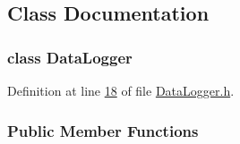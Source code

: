 \subsection{Class Documentation}
\label{class_data_logger}
\subsubsection{class Data\+Logger}


Definition at line \hyperlink{_data_logger_8h_source_l00018}{18} of file \hyperlink{_data_logger_8h_source}{Data\+Logger.\+h}.

\subsubsection*{Public Member Functions}
